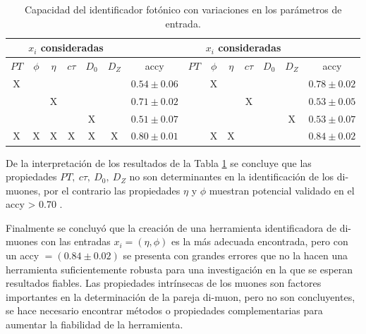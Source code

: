 \begin{table}[!h]
\footnotesize
\centering
\begin{tabular}{|cccccc|c||cccccc|c|}
\toprule
\multicolumn{6}{|c|}{$x_i$ consideradas} &  &
\multicolumn{6}{|c|}{$x_i$ consideradas} &  \\
\midrule
$PT$ & $\phi$ & $\eta$ & $c\tau$ & $D_0$ & $D_Z$  & \textsf{accy} &
$PT$ & $\phi$ & $\eta$ & $c\tau$ & $D_0$ & $D_Z$  & \textsf{accy} \\
\midrule
X &  &  &  &  &  & $0.54 \pm 0.06$ &
 & X &  &  &  &  & $0.78 \pm 0.02$\\
 &  & X &  &  &  & $0.71 \pm 0.02$ &
 &  &  & X &  &  & $0.53 \pm 0.05$\\
 &  &  &  & X &  & $0.51 \pm 0.07$ &
 &  &  &  &  & X & $0.53 \pm 0.07$\\
\bottomrule
X & X & X & X & X & X & $0.80 \pm 0.01$ &
 & X & X &  &  &  & $0.84 \pm 0.02$\\
\bottomrule 
\end{tabular}%
\caption{Capacidad del identificador fotónico con variaciones en los parámetros de entrada.}
\label{ajuste1}
\end{table}

De la interpretación de los resultados de la Tabla \ref{ajuste1} se concluye que las propiedades $PT, ~ c\tau, ~ D_0, ~D_Z$ no son determinantes en la identificación de los di-muones, por el contrario las propiedades $\eta$ y $\phi$ muestran potencial validado en el \textsf{accy} > 0.70 . 

Finalmente se concluyó que la creación de una herramienta identificadora de di-muones con las entradas $x_i=(\eta,\phi)$ es la más adecuada encontrada, pero con un \textsf{accy} $= (0.84 \pm 0.02)$ se presenta con grandes errores que no la hacen una herramienta suficientemente robusta para una investigación en la que se esperan resultados fiables. 
Las propiedades intrínsecas de los muones son factores importantes en la determinación de la pareja di-muon, pero no son concluyentes, se hace necesario encontrar métodos o propiedades complementarias para aumentar la fiabilidad de la herramienta.














